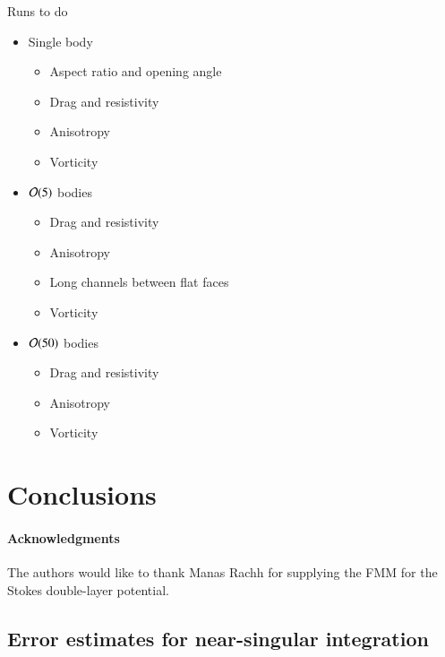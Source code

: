 \documentclass[preprint, 10pt]{elsarticle}
\begin{document}
Runs to do
\begin{itemize}
  \item Single body
  \begin{itemize}
    \item Aspect ratio and opening angle
    \item Drag and resistivity
    \item Anisotropy
    \item Vorticity
  \end{itemize}
  \item ${\mathcal{O}}(5)$ bodies
  \begin{itemize}
    \item Drag and resistivity
    \item Anisotropy
    \item Long channels between flat faces
    \item Vorticity
  \end{itemize}
  \item ${\mathcal{O}}(50)$ bodies
  \begin{itemize}
    \item Drag and resistivity
    \item Anisotropy
    \item Vorticity
  \end{itemize}
\end{itemize}


\section{Conclusions\label{s:conclusions}}


\paragraph{\bf Acknowledgments} The authors would like to thank Manas Rachh
for supplying the FMM for the Stokes double-layer potential.


\begin{appendices}
\section{Error estimates for near-singular integration \label{A:AppendixA}} 
\end{appendices}


 

\end{document}
